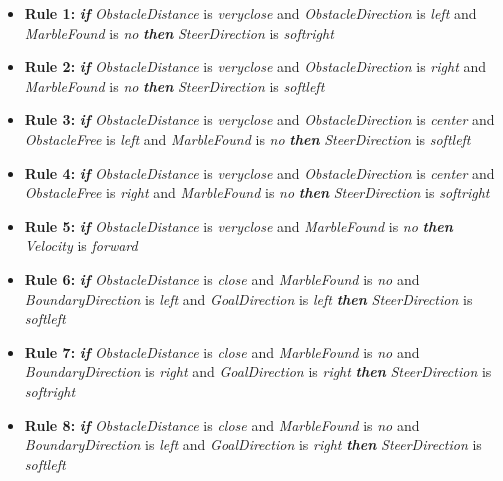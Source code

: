 \documentclass[../Head/Main.tex]{subfiles}
\begin{document}
\begin{itemize}
\item {\large \textbf{Rule 1:}} \textbf{\textit{if}} \textit{ObstacleDistance} is \textit{veryclose} and \textit{ObstacleDirection} is \textit{left} and \textit{MarbleFound} is \textit{no} \textbf{\textit{then}} \textit{SteerDirection} is \textit{softright}
 
\item {\large \textbf{Rule 2:}} \textbf{\textit{if}} \textit{ObstacleDistance} is \textit{veryclose} and \textit{ObstacleDirection} is \textit{right} and \textit{MarbleFound} is \textit{no} \textbf{\textit{then}} \textit{SteerDirection} is \textit{softleft}
 
\item {\large \textbf{Rule 3:}} \textbf{\textit{if}} \textit{ObstacleDistance} is \textit{veryclose} and \textit{ObstacleDirection} is \textit{center} and \textit{ObstacleFree} is \textit{left} and \textit{MarbleFound} is \textit{no} \textbf{\textit{then}} \textit{SteerDirection} is \textit{softleft}
 
\item {\large \textbf{Rule 4:}} \textbf{\textit{if}} \textit{ObstacleDistance} is \textit{veryclose} and \textit{ObstacleDirection} is \textit{center} and \textit{ObstacleFree} is \textit{right} and \textit{MarbleFound} is \textit{no} \textbf{\textit{then}} \textit{SteerDirection} is \textit{softright}
 
\item {\large \textbf{Rule 5:}} \textbf{\textit{if}} \textit{ObstacleDistance} is \textit{veryclose} and \textit{MarbleFound} is \textit{no} \textbf{\textit{then}} \textit{Velocity} is \textit{forward}

\item {\large \textbf{Rule 6:}} \textbf{\textit{if}} \textit{ObstacleDistance} is \textit{close} and \textit{MarbleFound} is \textit{no} and \textit{BoundaryDirection} is \textit{left} and \textit{GoalDirection} is \textit{left} \textbf{\textit{then}} \textit{SteerDirection} is \textit{softleft}
 
\item {\large \textbf{Rule 7:}} \textbf{\textit{if}} \textit{ObstacleDistance} is \textit{close} and \textit{MarbleFound} is \textit{no} and \textit{BoundaryDirection} is \textit{right} and \textit{GoalDirection} is \textit{right} \textbf{\textit{then}} \textit{SteerDirection} is \textit{softright}
 
\item {\large \textbf{Rule 8:}} \textbf{\textit{if}} \textit{ObstacleDistance} is \textit{close} and \textit{MarbleFound} is \textit{no} and \textit{BoundaryDirection} is \textit{left} and \textit{GoalDirection} is \textit{right} \textbf{\textit{then}} \textit{SteerDirection} is \textit{softleft}
 

\end{itemize}
\end{document}
